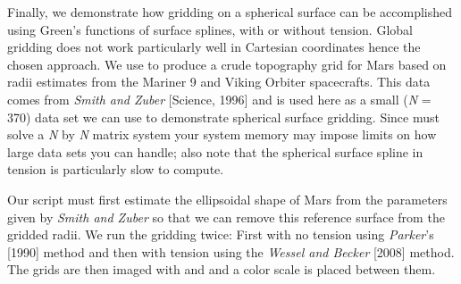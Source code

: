 Finally, we demonstrate how gridding on a spherical surface can be accomplished using Green's functions
of surface splines, with or without tension.  Global gridding does not work particularly well in
Cartesian coordinates hence the chosen approach.  We use  to produce a crude
topography grid for Mars based on radii estimates from the Mariner 9 and Viking Orbiter spacecrafts.
This data comes from \emph{Smith and Zuber} [Science, 1996] and is used here as a small (\emph{N} = 370) data set we
can use to demonstrate spherical surface gridding.  Since  must solve a \emph{N} by \emph{N}
matrix system your system memory may impose limits on how large data sets you can handle; also note that
the spherical surface spline in tension is particularly slow to compute.


Our script must first estimate the ellipsoidal shape of Mars from the parameters given by \emph{Smith and Zuber}
so that we can remove this reference surface from the gridded radii.  We run the gridding twice: First with
no tension using \emph{Parker}'s [1990] method and then with tension using the \emph{Wessel and Becker} [2008] method.
The grids are then imaged with  and  and a color scale is placed between
them.

 
